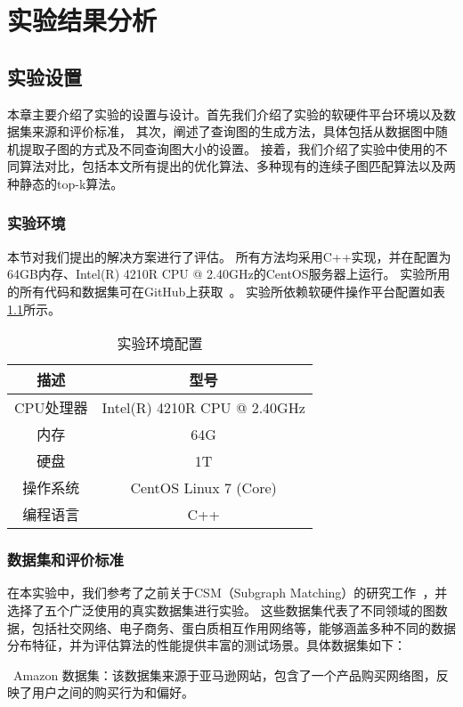 \def\itk{KiSD}
\def\pm{PBSM}
\chapter{实验结果分析}
\label{ch5:experiment}
\section{实验设置}
本章主要介绍了实验的设置与设计。首先我们介绍了实验的软硬件平台环境以及数据集来源和评价标准，
其次，阐述了查询图的生成方法，具体包括从数据图中随机提取子图的方式及不同查询图大小的设置。
接着，我们介绍了实验中使用的不同算法对比，包括本文所有提出的优化算法、多种现有的连续子图匹配算法以及两种静态的top-k算法。
\subsection{实验环境}
本节对我们提出的解决方案进行了评估。
所有方法均采用C++实现，并在配置为64GB内存、Intel(R) 4210R CPU @ 2.40GHz的CentOS服务器上运行。
实验所用的所有代码和数据集可在GitHub上获取~\cite{code-git-csmtok}。
实验所依赖软硬件操作平台配置如表\ref{table:setup}所示。
\begin{table}[H]
    \centering
    \caption{实验环境配置}
    \label{table:setup}
    \begin{tabular}{cc}
        \toprule
        描述   & 型号  \\
        \midrule
        CPU处理器 & Intel(R) 4210R CPU @ 2.40GHz\\
        内存 & 64G \\
        硬盘 & 1T\\
        操作系统 & CentOS Linux 7 (Core)\\
        编程语言 & C++ \\
        \bottomrule
    \end{tabular}
\end{table}

\subsection{数据集和评价标准}
\label{ss-sec:dataset}
在本实验中，我们参考了之前关于CSM（Subgraph Matching）的研究工作~\cite{csm-survey:DBLP:journals/pvldb/SunSLH22,static-sm:DBLP:conf/sigmod/Sun020}，并选择了五个广泛使用的真实数据集进行实验。
这些数据集代表了不同领域的图数据，包括社交网络、电子商务、蛋白质相互作用网络等，能够涵盖多种不同的数据分布特征，并为评估算法的性能提供丰富的测试场景。具体数据集如下：

\textbullet~Amazon 数据集：该数据集来源于亚马逊网站，包含了一个产品购买网络图，反映了用户之间的购买行为和偏好。

